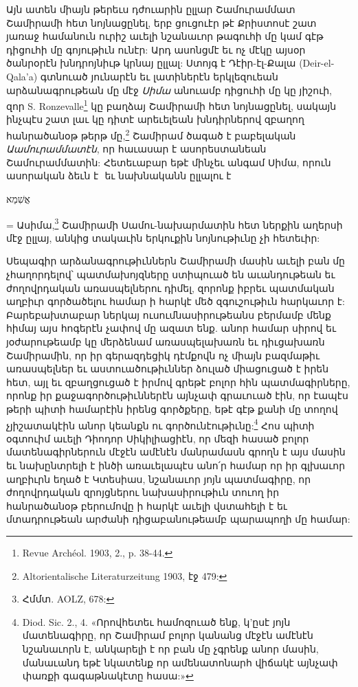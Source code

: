\documentclass{article}
\newcommand*\svgAAAA{}
\begin{document}
{Այն ատեն միայն թերեւս դժուարին ըլլար Շամուրամմատ Շամիրամի հետ նոյնացընել, երբ ցուցուէր թէ Քրիստոսէ շատ յառաջ համանուն ուրիշ աւելի նշանաւոր թագուհի մը կամ գէթ դիցուհի մը գոյութիւն ունէր: Արդ ասոնցմէ եւ ոչ մէկը այսօր ծանրօրէն խնդրոյնիւթ կրնայ ըլլալ: Ստոյգ է Դէիր-էլ-Քալա (Deir-el-Qala'a) գտնուած յունարէն եւ լատիներէն երկլեզուեան արձանագրութեան մը մէջ \emph{Սիմա} անուամբ դիցուհի մը կը յիշուի, զոր S. Ronzevalle\footnote{Revue Archéol. 1903, 2., p. 38-44.} կը բաղձայ Շամիրամի հետ նոյնացընել, սակայն ինչպէս շատ լաւ կը դիտէ արեւելեան խնդիրներով զբաղող հանրածանօթ թերթ մը,\footnote{Altorientalische Literaturzeitung 1903, էջ 479:} Շամիրամ ծագած է բաբելական \emph{Աամուրամմատէն}, որ հաւասար է ասորեստանեան Շամուրամմատին: Հետեւաբար եթէ մինչեւ անգամ Սիմա, որուն ասորական ձեւն է $\svgAAAA$ եւ նախնականն ըլլալու է \begin{hebrewfont}אֲשִׁמַא\end{hebrewfont} = Ասիմա,\footnote{Հմմտ. AOLZ, 678:} Շամիրամի Սամու-նախարմատին հետ ներքին աղերսի մէջ ըլլայ, անկից տակաւին երկուքին նոյնութիւնը չի հետեւիր:

Սեպագիր արձանագրութիւններն Շամիրամի մասին աւելի բան մը չհաղորդելով՝ պատմախոյզները ստիպուած են աւանդութեան եւ ժողովրդական առասպելներու դիմել, զորոնք իբրեւ պատմական աղբիւր գործածելու համար ի հարկէ մեծ զգուշութիւն հարկաւոր է: Բարեբախտաբար ներկայ ուսումնասիրութեանս բերմամբ մենք հիմայ այս հոգերէն չափով մը ազատ ենք. անոր համար սիրով եւ յօժարութեամբ կը մերձենամ առասպելախառն եւ դիւցախառն Շամիրամին, որ իր գերազդեցիկ դէմքովն ոչ միայն բազմաթիւ առասպելներ եւ աստուածութիւններ ձուլած միացուցած է իրեն հետ, այլ եւ զբաղցուցած է իրմով գրեթէ բոլոր հին պատմագիրները, որոնք իր քաջագործութիւններէն այնչափ գրաւուած էին, որ էապէս թերի պիտի համարէին իրենց գործքերը, եթէ գէթ քանի մը տողով չյիշատակէին անոր կեանքն ու գործունէութիւնը:\footnote{Diod. Sic. 2., 4. «Որովհետեւ համոզուած ենք, կ'ըսէ յոյն մատենագիրը, որ Շամիրամ բոլոր կանանց մէջէն ամէնէն նշանաւորն է, անկարելի է որ բան մը չգրենք անոր մասին, մանաւանդ եթէ նկատենք որ ամենատոնարհ վիճակէ այնչափ փառքի գագաթնակէտը հասա:»} Հոս պիտի օգտուիմ աւելի Դիոդոր Սիկիլիացիէն, որ մեզի հասած բոլոր մատենագիրներուն մէջէն ամէնէն մանրամասն գրողն է այս մասին եւ նախընտրելի է ինծի առաւելապէս անո՛ր համար որ իր գլխաւոր աղբիւրն եղած է Կտեսիաս, նշանաւոր յոյն պատմագիրը, որ ժողովրդական զրոյցներու նախասիրութիւն տուող իր հանրածանօթ բերումովը ի հարկէ աւելի վստահելի է եւ մտադրութեան արժանի դիցաբանութեամբ պարապողի մը համար:

}
\end{document}
